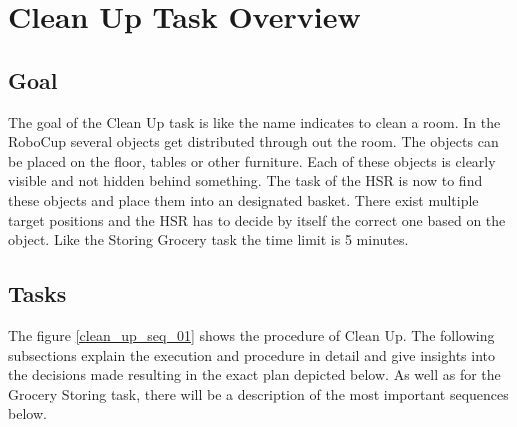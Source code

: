 \documentclass[main.tex]{subfiles}
\begin{document}
	\begingroup

	\renewcommand{\cleardoublepage}{}

	\renewcommand{\clearpage}{}

	\chapter{Clean Up Task Overview}

		
		\section{Goal}
		The goal of the Clean Up task is like the name indicates to clean a room. In the RoboCup several objects get distributed through out the room. The objects can be placed on the floor, tables or other furniture. Each of these objects is clearly visible and not hidden behind something. The task of the HSR is now to find these objects and place them into an designated basket. There exist multiple target positions and the HSR has to decide by itself the correct one based on the object. Like the Storing Grocery task the time limit is 5 minutes.

	  	\section{Tasks}
	  	The figure \ref{clean_up_seq_01} shows the procedure of Clean Up. The following subsections explain the execution and procedure in detail and give insights into the decisions made resulting in the exact plan depicted below. As well as for the Grocery Storing task, there will be a description of the most important sequences below.
\end{document}
